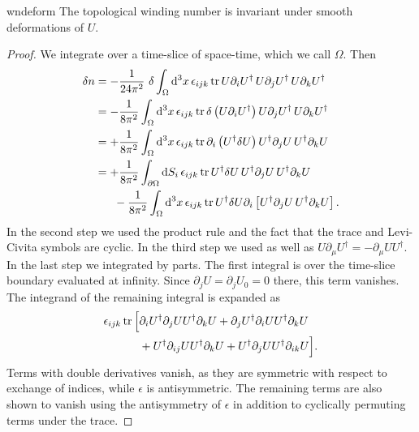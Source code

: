 \begin{theorem}{}{wndeform}
The topological winding number is invariant under smooth
deformations of $U$.
\begin{proof} We integrate  over a time-slice of space-time,
which we call $\Omega$. Then
  \begin{align*}
   \var n &=-\frac{1}{24\pi^2}~\var\int_\Omega\dd[3]{x}\epsilon_{ijk}\tr
                U\partial_iU^\dagger\,
                U\partial_jU^\dagger\,
                U\partial_kU^\dagger\\
            &=-\frac{1}{8\pi^2}\int_\Omega \dd[3]{x}\epsilon_{ijk}\tr
                \var\left(U\partial_iU^\dagger\right)
                            U\partial_jU^\dagger\,
                            U\partial_kU^\dagger\\
            &=+\frac{1}{8\pi^2}\int_\Omega \dd[3]{x}\epsilon_{ijk}\tr
                \partial_i\left(U^\dagger\var U\right)
                 U^\dagger\partial_jU\,
                 U^\dagger\partial_kU\\
           &=+\frac{1}{8\pi^2}\int_{\partial\Omega} \dd{S_i}\epsilon_{ijk}\tr
                U^\dagger\var U\,
                U^\dagger\partial_j U\,
                U^\dagger\partial_k U\\
            &~~~~~-\frac{1}{8\pi^2}\int_\Omega \dd[3]{x}\epsilon_{ijk}\tr
                U^\dagger\var U\partial_i\left[
                U^\dagger\partial_j U\,
                U^\dagger\partial_k U\right].
  \end{align*}
  In the second step we used the product rule and the fact that the trace 
  and Levi-Civita symbols are cyclic.
  In the third step we used  as well as
  $U\partial_\mu U^\dagger=-\partial_\mu UU^\dagger$. In the last step
  we integrated by parts. The first integral is over the time-slice boundary
  evaluated at infinity. Since $\partial_jU=\partial_jU_0=0$ there, this term
  vanishes. The integrand of the remaining integral is expanded as
  \begin{equation*}\begin{aligned}
    \epsilon_{ijk}\tr\Big[&
     \partial_i U^\dagger\partial_j U U^\dagger\partial_k U
     +\partial_j U^\dagger\partial_i U U^\dagger\partial_k U\\
     &+U^\dagger\partial_{ij}UU^\dagger\partial_k U
     +U^\dagger\partial_jUU^\dagger\partial_{ik}U\Big].
  \end{aligned}\end{equation*}
  Terms with double derivatives vanish, as they are symmetric with respect
  to exchange of indices, while $\epsilon$ is antisymmetric. The remaining
  terms are also shown to vanish using the antisymmetry of $\epsilon$
  in addition to cyclically permuting terms under the trace.
\end{proof}
\end{theorem}

